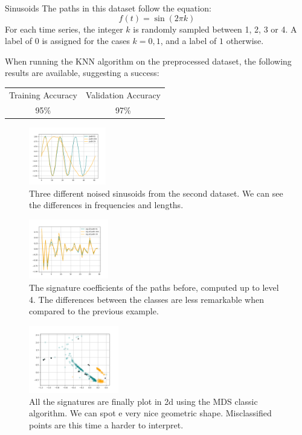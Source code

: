 \documentclass[twocolumn,9pt]{article}
\theoremstyle{definition}
\theoremstyle{remark}
\begin{document}
\begin{section}{Sinusoids}
The paths in this dataset follow the equation:
\begin{equation}
f(t) = \sin(2 \pi k)
\end{equation}
For each time series, the integer $k$
is randomly sampled between 1, 2, 3 or 4.
A label of $0$ is assigned for the cases $k = 0, 1$,
and a label of $1$ otherwise.


When running the KNN algorithm on the preprocessed dataset, the following
results are available, suggesting a success:

\begin{tabular}{ |c|c| }
\hline
Training Accuracy & Validation Accuracy \\
95\%	& 97\%	\\
\hline
\end{tabular}


\begin{figure}[H]
\center
\includegraphics[width=0.30\textwidth]{proposed_plots/SIN-paths-seed0.png}
\caption
{
Three different noised sinusoids from the second dataset.
We can see the differences in frequencies and lengths.
}
\end{figure}

\begin{figure}[H]
\center
\includegraphics[width=0.31\textwidth]{proposed_plots/SIN-signatures-seed0.png}
\caption{
The signature coefficients of the paths before,
computed up to level 4.
The differences between the classes
are less remarkable when compared to the previous example.
}
\end{figure}

\begin{figure}[H]
\center
\includegraphics[width=0.35\textwidth]{proposed_plots/SIN-isometry-seed0.png}
\caption{
All the signatures
are finally plot in 2d using the MDS classic algorithm.
We can spot e very nice geometric shape. Misclassified points
are this time a harder to interpret.
}
\end{figure}

\end{section} %
\end{document}
